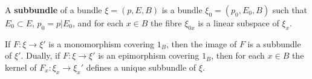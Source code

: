 A \textbf{subbundle} of a bundle $\xi = (p, E, B)$ is a bundle $\xi_0 = (p_0, E_0, B)$ such that $E_0 \subset E$, $p_0 = p|E_0$, and for each $x \in B$ the fibre $\xi_{0x}$ is a linear subspace of $\xi_x$.

If $F: \xi \to \xi'$ is a monomorphism covering $1_B$, then the image of $F$ is a subbundle of $\xi'$. Dually, if $F: \xi \to \xi'$ is an epimorphism covering $1_B$, then for each $x \in B$ the kernel of $F_x: \xi_x \to \xi_x'$ defines a unique subbundle of $\xi$.

